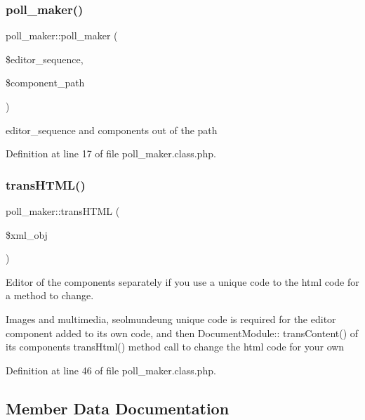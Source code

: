 \mbox{\label{classpoll__maker_ae8956a214b15ddd49a3e7538a15791ba}} 
\subsubsection{\texorpdfstring{poll\+\_\+maker()}{poll\_maker()}}
{\footnotesize\ttfamily poll\+\_\+maker\+::poll\+\_\+maker (\begin{DoxyParamCaption}\item[{}]{\$editor\+\_\+sequence,  }\item[{}]{\$component\+\_\+path }\end{DoxyParamCaption})}



editor\+\_\+sequence and components out of the path 



Definition at line 17 of file poll\+\_\+maker.\+class.\+php.

\mbox{\label{classpoll__maker_ac8d4b0f45f16016ad7f711123cc98ea8}} 
\subsubsection{\texorpdfstring{trans\+H\+T\+M\+L()}{transHTML()}}
{\footnotesize\ttfamily poll\+\_\+maker\+::trans\+H\+T\+ML (\begin{DoxyParamCaption}\item[{}]{\$xml\+\_\+obj }\end{DoxyParamCaption})}



Editor of the components separately if you use a unique code to the html code for a method to change. 

Images and multimedia, seolmundeung unique code is required for the editor component added to its own code, and then Document\+Module\+:\+: trans\+Content() of its components trans\+Html() method call to change the html code for your own 

Definition at line 46 of file poll\+\_\+maker.\+class.\+php.



\subsection{Member Data Documentation}
\mbox{\label{classpoll__maker_aed45da13a32668475091fceb3a3e526d}} 
